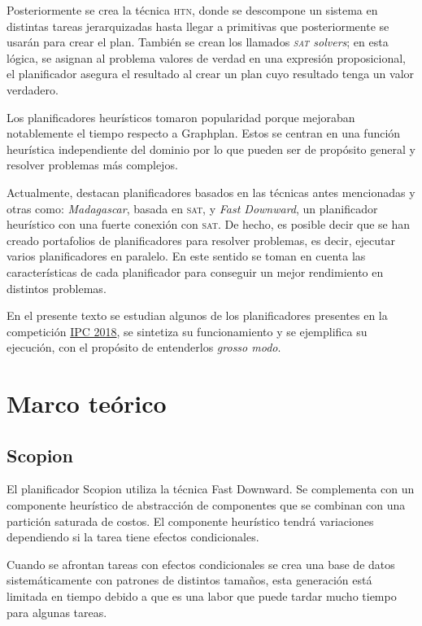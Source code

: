 \documentclass[a4paper,12pt,twocolumn]{article}
\begin{document}
Posteriormente se crea la técnica \textsc{htn}, donde se descompone un sistema en distintas tareas jerarquizadas hasta llegar a primitivas que posteriormente se usarán para crear el plan. También se crean los llamados \emph{\textsc{sat} solvers}; en esta lógica, se asignan al problema valores de verdad en una expresión proposicional, el planificador asegura el resultado al crear un plan cuyo resultado tenga un valor verdadero.\citep{Tapia_García_2017}

Los planificadores heurísticos tomaron popularidad porque mejoraban notablemente el tiempo respecto a Graphplan. Estos se centran en una función heurística independiente del dominio por lo que pueden ser de propósito general y resolver problemas más complejos.\citep{Tapia_García_2017}

Actualmente, destacan planificadores basados en las técnicas antes mencionadas y otras como: \emph{Madagascar}, basada en \textsc{sat}, y \emph{Fast Downward}, un planificador heurístico con una fuerte conexión con \textsc{sat}. De hecho, es posible decir que se han creado portafolios de planificadores para resolver problemas, es decir, ejecutar varios planificadores en paralelo. En este sentido se toman en cuenta las características de cada planificador para conseguir un mejor rendimiento en distintos problemas.\citep{Tapia_García_2017}

En el presente texto se estudian algunos de los planificadores presentes en la competición \href{https://ipc2018-classical.bitbucket.io/}{IPC 2018}, se sintetiza su funcionamiento y se ejemplifica su ejecución, con el propósito de entenderlos \textit{grosso modo}.

\section{Marco teórico}

\subsection{Scopion}

El planificador Scopion\citep{seipp2018scorpion} utiliza la técnica Fast Downward. Se complementa con un componente heurístico de abstracción de componentes que se combinan con una partición saturada de costos. El componente heurístico tendrá variaciones dependiendo si la tarea tiene efectos condicionales.

Cuando se afrontan tareas con efectos condicionales se crea una base de datos sistemáticamente con patrones de distintos tamaños, esta generación está limitada en tiempo debido a que es una labor que puede tardar mucho tiempo para algunas tareas.
\end{document}
